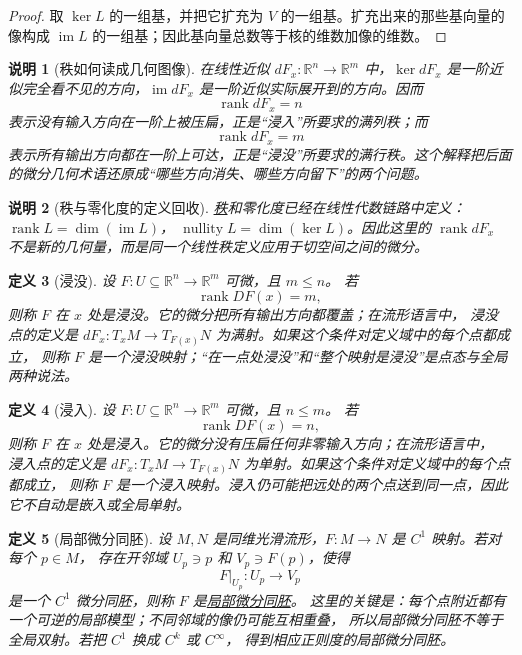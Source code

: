 \documentclass[UTF8,fontset=none,a4paper,11pt]{ctexart}
\theoremstyle{foundation-definition}
\newtheorem{definition}{定义}[section]
\theoremstyle{foundation-theorem}
\theoremstyle{foundation-proposition}
\theoremstyle{foundation-example}
\theoremstyle{foundation-remark}
\newtheorem{remark}[definition]{说明}
\theoremstyle{foundation-theorem}
\newcommand{\term}[2]{\hyperref[#1]{#2}}
\begin{document}
\begin{proof}
取 \(\ker L\) 的一组基，并把它扩充为 \(V\) 的一组基。扩充出来的那些基向量的像构成 \(\operatorname{im}L\) 的一组基；因此基向量总数等于核的维数加像的维数。
\end{proof}

\begin{remark}[秩如何读成几何图像]
在线性近似 \(dF_x:\mathbb R^n\to\mathbb R^m\) 中，\(\ker dF_x\) 是一阶近似完全看不见的方向，\(\operatorname{im}dF_x\) 是一阶近似实际展开到的方向。因而
\[
\operatorname{rank}dF_x=n
\]
表示没有输入方向在一阶上被压扁，正是“浸入”所要求的满列秩；而
\[
\operatorname{rank}dF_x=m
\]
表示所有输出方向都在一阶上可达，正是“浸没”所要求的满行秩。这个解释把后面的微分几何术语还原成“哪些方向消失、哪些方向留下”的两个问题。
\end{remark}

\begin{remark}[秩与零化度的定义回收]\label{rem:rank-nullity-recall}
\term{def:linear-rank}{秩}和零化度已经在线性代数链路中定义：
\(\operatorname{rank}L=\dim(\operatorname{im}L)\)，
\(\operatorname{nullity}L=\dim(\ker L)\)。因此这里的
\(\operatorname{rank}dF_x\) 不是新的几何量，而是同一个线性秩定义应用于切空间之间的微分。
\end{remark}

\begin{definition}[浸没]\label{def:submersion}
设 \(F:U\subseteq\mathbb R^n\to\mathbb R^m\) 可微，且 \(m\leq n\)。
若
\[
\operatorname{rank}DF(x)=m,
\]
则称 \(F\) 在 \(x\) 处是浸没。它的微分把所有输出方向都覆盖；在流形语言中，
浸没点的定义是 \(dF_x:T_xM\to T_{F(x)}N\) 为满射。如果这个条件对定义域中的每个点都成立，
则称 \(F\) 是一个浸没映射；“在一点处浸没”和“整个映射是浸没”是点态与全局两种说法。
\end{definition}

\begin{definition}[浸入]\label{def:immersion}
设 \(F:U\subseteq\mathbb R^n\to\mathbb R^m\) 可微，且 \(n\leq m\)。
若
\[
\operatorname{rank}DF(x)=n,
\]
则称 \(F\) 在 \(x\) 处是浸入。它的微分没有压扁任何非零输入方向；在流形语言中，
浸入点的定义是 \(dF_x:T_xM\to T_{F(x)}N\) 为单射。如果这个条件对定义域中的每个点都成立，
则称 \(F\) 是一个浸入映射。浸入仍可能把远处的两个点送到同一点，因此它不自动是嵌入或全局单射。
\end{definition}

\begin{definition}[局部微分同胚]\label{def:local-diffeomorphism}
设 \(M,N\) 是同维光滑流形，\(F:M\to N\) 是 \(C^1\) 映射。若对每个 \(p\in M\)，
存在开邻域 \(U_p\ni p\) 和 \(V_p\ni F(p)\)，使得
\[
F|_{U_p}:U_p\longrightarrow V_p
\]
是一个 \(C^1\) 微分同胚，则称 \(F\) 是\term{def:local-diffeomorphism}{局部微分同胚}。
这里的关键是：每个点附近都有一个可逆的局部模型；不同邻域的像仍可能互相重叠，
所以局部微分同胚不等于全局双射。若把 \(C^1\) 换成 \(C^k\) 或 \(C^\infty\)，
得到相应正则度的局部微分同胚。
\end{definition}
\end{document}
